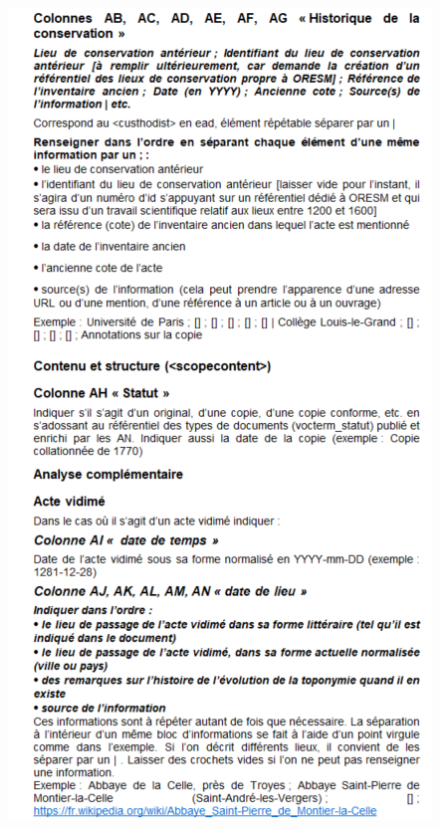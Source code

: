\begin{figure}[!h]
    \centering
    \includegraphics[width=0.85\linewidth]{annexes/methodologie4.png}
\end{figure}
